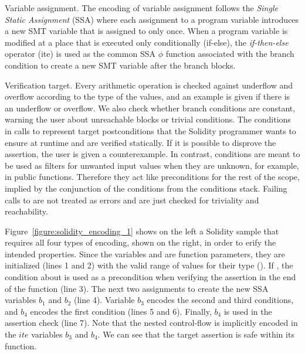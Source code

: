 \begin{paragraph}{Variable assignment.}
The encoding of variable assignment follows the \emph{Single Static Assignment}
(SSA) where each assignment to a program variable introduces a new SMT variable
that is assigned to only once.
%
When a program variable is modified at a place that is executed only
conditionally (if-else), the \emph{if-then-else} operator (ite) is used as the
common SSA $\phi$ function associated with the branch condition to create a new
SMT variable after the branch blocks.
\end{paragraph}

\begin{paragraph}{Verification target.}
Every arithmetic operation is checked against underflow and overflow according
to the type of the values, and an example is given if there is an underflow or
overflow.
%
We also check whether branch conditions are constant, warning the user about
unreachable blocks or trivial conditions.
%
The conditions in calls to  represent target postconditions that the
Solidity programmer wants to ensure at runtime and are verified statically.
%
If it is possible to disprove the assertion, the user is given a
counterexample.
%
In contrast,  conditions are meant to be used as
filters for unwanted input values when they are unknown, for example, in public
functions.
%
Therefore they act like preconditions for the rest of the scope, implied by the
conjunction of the conditions from the conditions stack.
%
Failing calls to  are not treated as errors and
are just checked for triviality and reachability.
\end{paragraph}

Figure~\ref{figure:solidity_encoding_1} shows on the left a Solidity sample
that requires all four types of encoding, shown on the right, in order to
erify the intended properties.
%
Since the variables  and  are function
parameters, they are initialized (lines 1 and 2) with the valid range of values
for their type ().
%
If , the  condition about  is used as a
precondition when verifying the assertion in the end of the function (line 3).
%
The next two assignments to  create the new SSA variables
$b_1$ and $b_2$ (line 4).
%
Variable $b_3$ encodes the second and third conditions, and $b_4$
encodes the first condition (lines 5 and 6).
%
Finally, $b_4$ is used in the assertion check (line 7).
%
Note that the nested control-flow is implicitly encoded in the $ite$
variables $b_3$ and $b_4$.
%
We can see that the target assertion is safe within its function.

